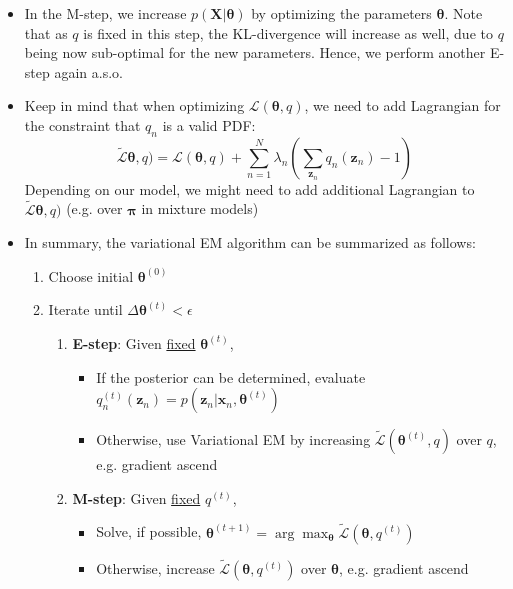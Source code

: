 \begin{itemize}
	\item In the M-step, we increase $p(\bm{X}|\bm{\theta})$ by optimizing the parameters $\bm{\theta}$. Note that as $q$ is fixed in this step, the KL-divergence will increase as well, due to $q$ being now sub-optimal for the new parameters. Hence, we perform another E-step again a.s.o.
	\item Keep in mind that when optimizing $\mathcal{L}(\bm{\theta}, q)$, we need to add Lagrangian for the constraint that $q_n$ is a valid PDF:
	$$\tilde{\mathcal{L}}\bm{\theta}, q) = \mathcal{L}(\bm{\theta}, q) + \sum_{n=1}^{N} \lambda_n \left(\sum_{\bm{z}_n} q_n(\bm{z}_n) - 1\right)$$
	Depending on our model, we might need to add additional Lagrangian to $\tilde{\mathcal{L}}\bm{\theta}, q)$ (e.g. over $\bm{\pi}$ in mixture models)
	\item In summary, the variational EM algorithm can be summarized as follows:
	
	\begin{tcolorbox}[colback=white!80!gray,colframe=gray!75!black,title=Variational EM algorithm]
		\begin{enumerate}
			\item Choose initial $\bm{\theta}^{(0)}$
			\item Iterate until $\Delta \bm{\theta}^{(t)} < \epsilon$
			\begin{enumerate}
				\item \textbf{E-step}: Given \underline{fixed} $\bm{\theta}^{(t)}$,
				\begin{itemize}
					\item If the posterior can be determined, evaluate $q_n^{(t)}(\bm{z}_n) = p(\bm{z}_n|\bm{x}_n, \bm{\theta}^{(t)})$
					\item Otherwise, use Variational EM by increasing $\tilde{\mathcal{L}}(\bm{\theta}^{(t)}, q)$ over $q$, e.g. gradient ascend
				\end{itemize}
				\item \textbf{M-step}: Given \underline{fixed} $q^{(t)}$,
				\begin{itemize}
					\item Solve, if possible, $\bm{\theta}^{(t+1)} = \arg\max_{\bm{\theta}} \tilde{\mathcal{L}}(\bm{\theta}, q^{(t)})$ %
					\item Otherwise, increase $\tilde{\mathcal{L}}(\bm{\theta}, q^{(t)})$ over $\bm{\theta}$, e.g. gradient ascend
				\end{itemize}
			\end{enumerate}
		\end{enumerate}
	\end{tcolorbox}
\end{itemize}
